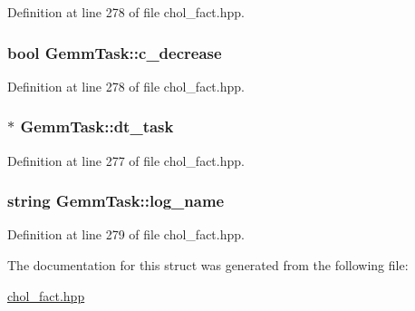 Definition at line 278 of file chol\_\-fact.hpp.\hypertarget{struct_gemm_task_ad557fa1b97cac4870423c0ed9449edc0}{
\subsubsection[{c\_\-decrease}]{\setlength{\rightskip}{0pt plus 5cm}bool {\bf GemmTask::c\_\-decrease}}}
\label{struct_gemm_task_ad557fa1b97cac4870423c0ed9449edc0}


Definition at line 278 of file chol\_\-fact.hpp.\hypertarget{struct_gemm_task_a1ff91e561ce824a648516638e3b89fb2}{
\subsubsection[{dt\_\-task}]{$\ast$ {\bf GemmTask::dt\_\-task}}}
\label{struct_gemm_task_a1ff91e561ce824a648516638e3b89fb2}


Definition at line 277 of file chol\_\-fact.hpp.\hypertarget{struct_gemm_task_aeac5a3c852d1c101388988f3ec20465a}{
\subsubsection[{log\_\-name}]{\setlength{\rightskip}{0pt plus 5cm}string {\bf GemmTask::log\_\-name}}}
\label{struct_gemm_task_aeac5a3c852d1c101388988f3ec20465a}


Definition at line 279 of file chol\_\-fact.hpp.

The documentation for this struct was generated from the following file:\begin{DoxyCompactItemize}
\item 
\hyperlink{chol__fact_8hpp}{chol\_\-fact.hpp}\end{DoxyCompactItemize}
